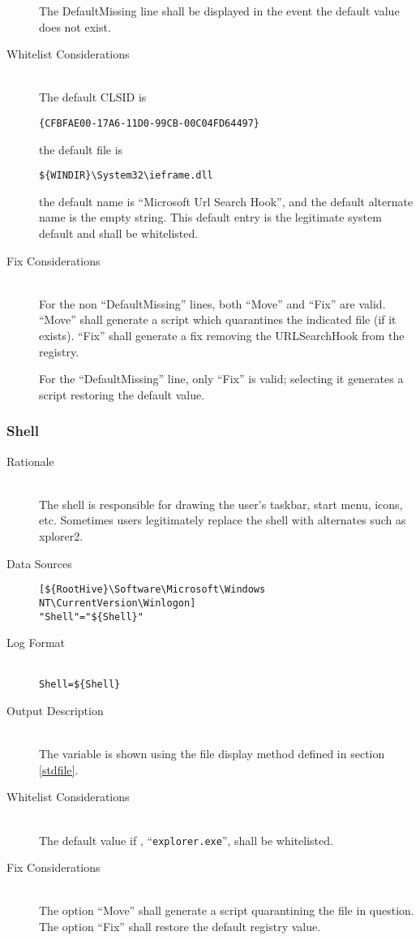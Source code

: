 \begin{description}
The DefaultMissing line shall be displayed in the event the default value does
not exist.
\item[Whitelist Considerations] \hfill \\
The default CLSID is
\vspace{-\baselineskip}
\begin{verbatim}
{CFBFAE00-17A6-11D0-99CB-00C04FD64497}
\end{verbatim}
the default file is
\vspace{-\baselineskip}
\begin{verbatim}
${WINDIR}\System32\ieframe.dll
\end{verbatim}
the default name
is ``Microsoft Url Search Hook'', and the default alternate name is the empty
string.
This default entry is the legitimate system default and shall be whitelisted.
\item[Fix Considerations] \hfill \\
For the non ``DefaultMissing'' lines, both ``Move'' and ``Fix'' are valid.
``Move'' shall generate a script which quarantines the indicated file (if it
exists). ``Fix'' shall generate a fix removing the URLSearchHook from the
registry.

For the ``DefaultMissing'' line, only ``Fix'' is valid; selecting it generates a
script restoring the default value.
\end{description}

\subsubsection{Shell}
\begin{description}
\item[Rationale] \hfill \\
The shell is responsible for drawing the user's taskbar, start menu, icons, etc.
Sometimes users legitimately replace the shell with alternates such as xplorer2.
\item[Data Sources] \hfill
\vspace{-\baselineskip}
\begin{verbatim}
[${RootHive}\Software\Microsoft\Windows NT\CurrentVersion\Winlogon]
"Shell"="${Shell}"
\end{verbatim}
\item[Log Format] \hfill \\
\verb|Shell=${Shell}|
\item[Output Description] \hfill \\
The variable  is shown using the file display method defined in
section \ref{stdfile}.
\item[Whitelist Considerations] \hfill \\
The default value if , ``\verb|explorer.exe|'', shall be whitelisted.
\item[Fix Considerations] \hfill \\
The option ``Move'' shall generate a script quarantining the file in question.
The option ``Fix'' shall restore the default registry value.
\end{description}

